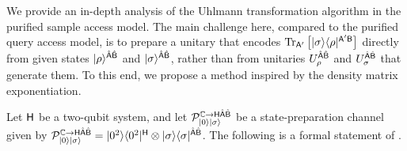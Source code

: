 


We provide an in-depth analysis of the Uhlmann transformation algorithm in the purified sample access model.
The main challenge here, compared to the purified query access model, is to prepare a unitary that encodes $\operatorname{Tr}_{{\mathsf{A}}'}\big[|\sigma\rangle\langle\rho|^{{\mathsf{A}}'{\mathsf{B}}}\big]$ directly from given states $|\rho\rangle^{\hat{{\mathsf{A}}}\hat{{\mathsf{B}}}}$ and $|\sigma\rangle^{\hat{{\mathsf{A}}}\hat{{\mathsf{B}}}}$, rather than from unitaries $U_\rho^{\hat{{\mathsf{A}}}\hat{{\mathsf{B}}}}$ and $U_\sigma^{\hat{{\mathsf{A}}}\hat{{\mathsf{B}}}}$ that generate them.
To this end, we propose a method inspired by the density matrix exponentiation.


Let ${\mathsf{H}}$ be a two-qubit system, and let ${\mathcal{P}}_{|0\rangle|\sigma\rangle}^{\mathbb{C}\rightarrow{\mathsf{H}}\hat{{\mathsf{A}}}\hat{{\mathsf{B}}}}$ be a state-preparation channel given by ${\mathcal{P}}_{|0\rangle|\sigma\rangle}^{\mathbb{C}\rightarrow{\mathsf{H}}\hat{{\mathsf{A}}}\hat{{\mathsf{B}}}} = |0^2\rangle\langle0^2|^{\mathsf{H}} \otimes |\sigma\rangle\langle\sigma|^{\hat{{\mathsf{A}}}\hat{{\mathsf{B}}}}$.
The following is a formal statement of .





